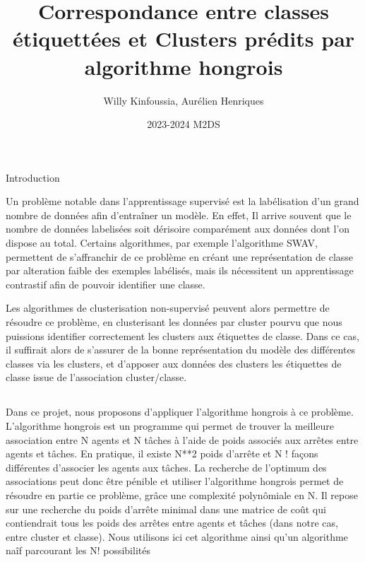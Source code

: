 \documentclass[
]{article}
\title{Correspondance entre classes étiquettées et Clusters prédits par
algorithme hongrois}
\author{Willy Kinfoussia, Aurélien Henriques}
\date{2023-2024 M2DS}
\begin{document}
\maketitle

\hypertarget{section}{%
\subsection{}\label{section}}

Introduction

Un problème notable dans l'apprentissage supervisé est la labélisation
d'un grand nombre de données afin d'entraîner un modèle. En effet, Il
arrive souvent que le nombre de données labelisées soit dérisoire
comparément aux données dont l'on dispose au total. Certains
algorithmes, par exemple l'algorithme SWAV, permettent de s'affranchir
de ce problème en créant une représentation de classe par alteration
faible des exemples labélisés, mais ils nécessitent un apprentissage
contrastif afin de pouvoir identifier une classe.

Les algorithmes de clusterisation non-supervisé peuvent alors permettre
de résoudre ce problème, en clusterisant les données par cluster pourvu
que nous puissions identifier correctement les clusters aux étiquettes
de classe. Dans ce cas, il suffirait alors de s'assurer de la bonne
représentation du modèle des différentes classes via les clusters, et
d'apposer aux données des clusters les étiquettes de classe issue de
l'association cluster/classe.

\hypertarget{section-1}{%
\subsection{}\label{section-1}}

Dans ce projet, nous proposons d'appliquer l'algorithme hongrois à ce
problème. L'algorithme hongrois est un programme qui permet de trouver
la meilleure association entre N agents et N tâches à l'aide de poids
associés aux arrêtes entre agents et tâches. En pratique, il existe N**2
poids d'arrête et N ! façons différentes d'associer les agents aux
tâches. La recherche de l'optimum des associations peut donc être
pénible et utiliser l'algorithme hongrois permet de résoudre en partie
ce problème, grâce une complexité polynômiale en N. Il repose sur une
recherche du poids d'arrête minimal dans une matrice de coût qui
contiendrait tous les poids des arrêtes entre agents et tâches (dans
notre cas, entre cluster et classe). Nous utilisons ici cet algorithme
ainsi qu'un algorithme naîf parcourant les N! possibilités
\end{document}
